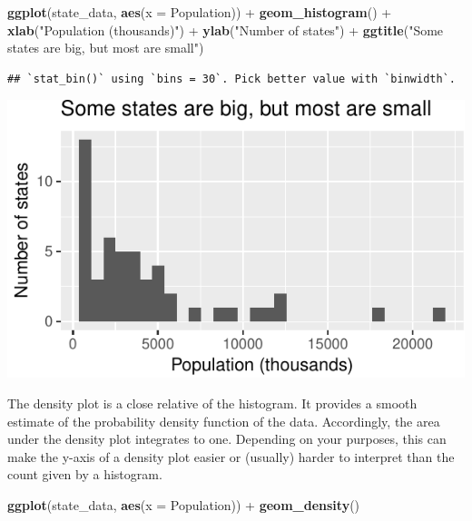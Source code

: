 \documentclass[12pt,oneside,openany]{book}
\newenvironment{Shaded}{\begin{snugshade}}{\end{snugshade}}
\newcommand{\KeywordTok}[1]{\textcolor[rgb]{0.13,0.29,0.53}{\textbf{{#1}}}}
\newcommand{\DataTypeTok}[1]{\textcolor[rgb]{0.13,0.29,0.53}{{#1}}}
\newcommand{\StringTok}[1]{\textcolor[rgb]{0.31,0.60,0.02}{{#1}}}
\newcommand{\NormalTok}[1]{{#1}}
\begin{document}
\begin{Shaded}
\begin{Highlighting}[]
\KeywordTok{ggplot}\NormalTok{(state_data, }\KeywordTok{aes}\NormalTok{(}\DataTypeTok{x =} \NormalTok{Population)) +}
\StringTok{  }\KeywordTok{geom_histogram}\NormalTok{() +}
\StringTok{  }\KeywordTok{xlab}\NormalTok{(}\StringTok{"Population (thousands)"}\NormalTok{) +}
\StringTok{  }\KeywordTok{ylab}\NormalTok{(}\StringTok{"Number of states"}\NormalTok{) +}
\StringTok{  }\KeywordTok{ggtitle}\NormalTok{(}\StringTok{"Some states are big, but most are small"}\NormalTok{)}
\end{Highlighting}
\end{Shaded}

\begin{verbatim}
## `stat_bin()` using `bins = 30`. Pick better value with `binwidth`.
\end{verbatim}

\includegraphics{pdaps_files/figure-latex/axis-labeling-1.pdf}

The density plot is a close relative of the histogram. It provides a
smooth estimate of the probability density function of the data.
Accordingly, the area under the density plot integrates to one.
Depending on your purposes, this can make the y-axis of a density plot
easier or (usually) harder to interpret than the count given by a
histogram.

\begin{Shaded}
\begin{Highlighting}[]
\KeywordTok{ggplot}\NormalTok{(state_data, }\KeywordTok{aes}\NormalTok{(}\DataTypeTok{x =} \NormalTok{Population)) +}
\StringTok{  }\KeywordTok{geom_density}\NormalTok{()}
\end{Highlighting}
\end{Shaded}
\end{document}
